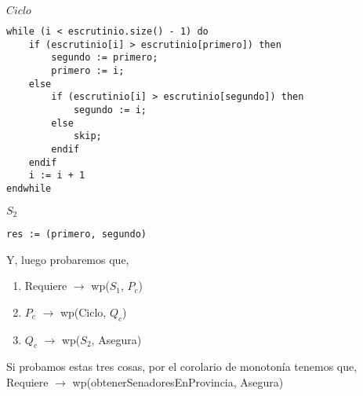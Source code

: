 \documentclass[10pt,a4paper]{article}
\begin{document}
\vspace{0.3cm}

$Ciclo$
	\begin{lstlisting}[caption={},label=code:for]
while (i < escrutinio.size() - 1) do
	if (escrutinio[i] > escrutinio[primero]) then
		segundo := primero;
		primero := i;
	else
		if (escrutinio[i] > escrutinio[segundo]) then
			segundo := i;
		else
			skip;
		endif
	endif
	i := i + 1
endwhile
	\end{lstlisting}

\vspace{0.3cm}

$S_2$

	\begin{lstlisting}[caption={},label=code:for]
res := (primero, segundo)
	\end{lstlisting}

\vspace{0.3cm}

\noindent Y, luego probaremos que,


\begin{enumerate}\setlength{\itemindent}{0.5cm}
		\item Requiere $\rightarrow$ wp($S_1$, $P_c$)
		\item $P_c$ $\rightarrow$ wp(Ciclo, $Q_c$)
		\item $Q_c$ $\rightarrow$ wp($S_2$, Asegura)
\end{enumerate}

\noindent Si probamos estas tres cosas, por el corolario de monotonía tenemos que, \vspace{0.2cm} \\
\indent \qquad \quad Requiere $\rightarrow$ wp(obtenerSenadoresEnProvincia, Asegura)

\vspace{0.3cm}
\end{document}
